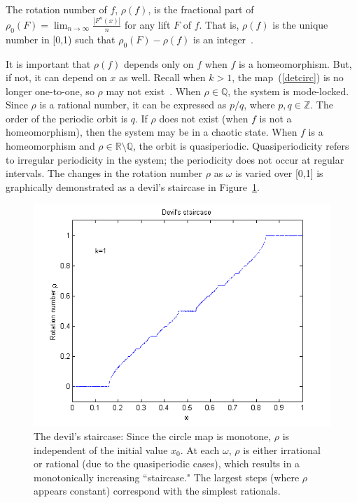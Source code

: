\begin{singlespacing}
\begin{definition}\label{rho}
The rotation number of $f$, $\rho(f)$, is the fractional part of
$\rho_0(F) = \lim_{n \to \infty} \frac{|F^n(x)|}{n}$ for any lift $F$ of $f$. That is, $\rho(f)$ is the unique
number in [0,1) such that $\rho_0(F)-\rho(f)$ is an integer~\cite{devaney}.
\end{definition}
\end{singlespacing}

\noindent It is important that $\rho(f)$ depends only on $f$ when $f$
is a homeomorphism. But, if not, it can depend on $x$ as well. Recall when $k>1$,
the map~(\ref{detcirc}) is no longer one-to-one, so $\rho$
may not exist~\cite{devaney}. When $\rho \in \mathbb{Q}$, the system is mode-locked. Since
$\rho$ is a rational number, it can be expressed as $p/q$, where $p,q
\in \mathbb{Z}$. The order of the periodic orbit is $q$. If $\rho$
does not exist (when $f$ is not a homeomorphism), then the system may be in a chaotic
state. When $f$ is a homeomorphism and $\rho \in \mathbb{R} \setminus
\mathbb{Q}$, the orbit is quasiperiodic. Quasiperiodicity refers to irregular periodicity in the
system; the periodicity does
not occur at regular intervals. The changes in the rotation number $\rho$ as $\omega$ is
varied over [0,1] is graphically demonstrated as a devil's staircase
in Figure~\ref{fig:devil_det}. 
\begin{figure}[!h]
\caption[The devil's staircase for the deterministic circle map]{The devil's
  staircase: Since the circle map is monotone, $\rho$ is independent of
  the initial value $x_0$. At each $\omega$, $\rho$ is either
  irrational or rational (due to the quasiperiodic cases), which results in a monotonically increasing  ``staircase." The largest steps (where $\rho$ appears constant)
  correspond with the simplest rationals.}\label{fig:devil_det}
	\begin{center}
		\includegraphics[scale=0.7]{figs/devil_nonrandom_k1.png}
	\end{center}
\end{figure}

